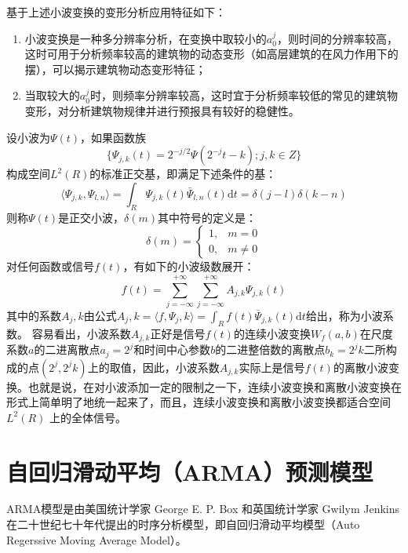 基于上述小波变换的变形分析应用特征如下：
\begin{enumerate}[label=（\arabic*）]
	\item 小波变换是一种多分辨率分析，在变换中取较小的$a_0^j$，则时间的分辨率较高，这时可用于分析频率较高的建筑物的动态变形（如高层建筑的在风力作用下的摆），可以揭示建筑物动态变形特征；
	\item 当取较大的$a_0^j$时，则频率分辨率较高，这时宜于分析频率较低的常见的建筑物变形，对分析建筑物规律并进行预报具有较好的稳健性。
\end{enumerate}

设小波为$\Psi(t)$，如果函数族$$\{ \Psi_{j,k}(t) = 2^{-j/2} \Psi (2^{-j}t-k);j,k\in Z \}$$构成空间$L^2(R)$的标准正交基，即满足下述条件的基：
\begin{equation}
	\langle \Psi_{j,k} , \Psi_{l,n} \rangle = \int_R \Psi_{j,k}(t) \bar{\Psi}_{l,n}(t) \mathrm{d}t = \delta (j-l) \delta (k-n)
\end{equation}
则称$\Psi(t)$是正交小波，$\delta (m)$其中符号的定义是：
\begin{equation}
	\delta (m) = 
	\left\{
	\begin{array}{cl}
	1, & m=0\\
	0, & m\neq0
	\end{array}
	\right.
\end{equation}
对任何函数或信号$f(t)$，有如下的小波级数展开：
\begin{equation}
	f(t) = \sum_{j=-\infty}^{+\infty} \sum_{j=-\infty}^{+\infty} A_{j,k} \Psi_{j,k} (t)
\end{equation}
其中的系数$A_j,k$由公式$A_j,k = \langle f, \Psi_j,k\rangle = \int_R f(t) \bar{\Psi}_{j,k}(t) \mathrm{d}t$给出，称为小波系数。
容易看出，小波系数$A_{j,k}$正好是信号$f(t)$的连续小波变换$W_f(a,b)$在尺度系数$a$的二进离散点$a_j=2^j$和时间中心参数$b$的二进整倍数的离散点$b_k = 2^jk$二所构成的点$(2^j,2^jk)$上的取值，因此，小波系数$A_{j,k}$实际上是信号$f(t)$的离散小波变换。也就是说，在对小波添加一定的限制之一下，连续小波变换和离散小波变换在形式上简单明了地统一起来了，而且，连续小波变换和离散小波变换都适合空间 $L^2(R)$ 上的全体信号。

\section{自回归滑动平均（ARMA）预测模型}
ARMA模型是由美国统计学家 George E. P. Box 和英国统计学家 Gwilym Jenkins 在二十世纪七十年代提出的时序分析模型，即自回归滑动平均模型（Auto Regerssive Moving Average Model）。

